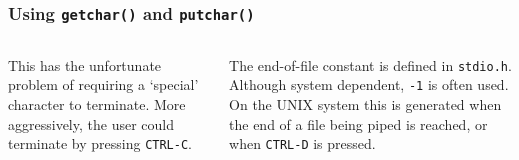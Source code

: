 \begin{frame}[fragile]
\frametitle{Using {\tt getchar()} and {\tt putchar()}}
\begin{columns}[T]
\begin{column}{0.45\textwidth}



{\footnotesize
This has the unfortunate problem of requiring a `special' character to terminate.
More aggressively, the user could terminate by pressing {\tt CTRL-C}.
}
\end{column}

\pause
\begin{column}{0.45\textwidth}


{\footnotesize
The end-of-file constant is defined in {\tt stdio.h}. Although
system dependent, {\tt -1} is often used. On the UNIX system
this is generated when the end of a file being piped is reached,
or when {\tt CTRL-D} is pressed.
}
\end{column}
\end{columns}
\end{frame}



